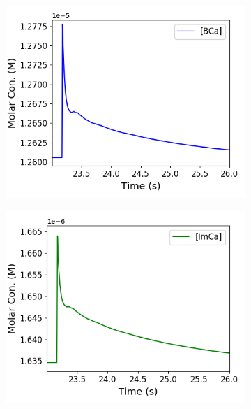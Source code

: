 \documentclass[a4paper,12pt]{article}
\theoremstyle{definition}
\begin{document}
\begin{figure}[p]
\begin{subfigure}{0.5\textwidth}
    \includegraphics[width=\textwidth]{figures/concentration_dynamics_18_zoomed_BCa.png}
    \caption{}
  \end{subfigure}
  \begin{subfigure}{0.5\textwidth}
    \includegraphics[width=\textwidth]{figures/concentration_dynamics_18_zoomed_ImCa.png}
    \caption{}
  \end{subfigure}
  \begin{subfigure}{0.5\textwidth}

\end{subfigure}
\end{figure}
\end{document}

